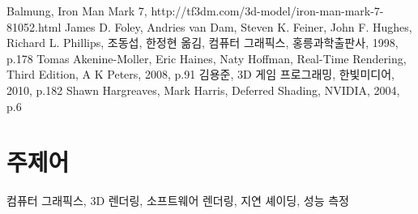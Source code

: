 \documentclass[a4paper,itemph,amsmath,oneside,11pt,openany]{xoblivoir}
\begin{document}
\begin{thebibliography}{99}
 Balmung, Iron Man Mark 7, http://tf3dm.com/3d-model/iron-man-mark-7-81052.html
James D. Foley, Andries van Dam, Steven K. Feiner, John F. Hughes, Richard L. Phillips, 조동섭, 한정현 옮김, 컴퓨터 그래픽스, 홍릉과학출판사, 1998, p.178
 Tomas Akenine-Moller, Eric Haines, Naty Hoffman, Real-Time Rendering, Third Edition, A K Peters, 2008, p.91
 김용준, 3D 게임 프로그래밍, 한빛미디어, 2010, p.182
 Shawn Hargreaves, Mark Harris, Deferred Shading, NVIDIA, 2004, p.6
\end{thebibliography}

\section*{주제어}
컴퓨터 그래픽스, 3D 렌더링, 소프트웨어 렌더링, 지연 셰이딩, 성능 측정
\end{document}
